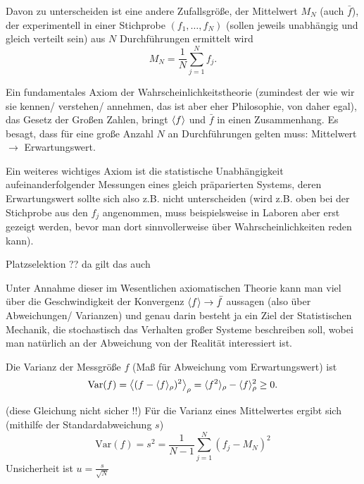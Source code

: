 Davon zu unterscheiden ist eine andere Zufallsgröße, der Mittelwert $M_N$ (auch $\bar{f}$), der experimentell in einer Stichprobe $(f_1, \dots, f_N)$ (sollen jeweils  unabhängig und gleich verteilt sein) aus $N$ Durchführungen ermittelt wird
\begin{equation}\label{key}
M_N = \frac{1}{N} \sum\limits_{j=1}^N f_j .
\end{equation}

Ein fundamentales Axiom der Wahrscheinlichkeitstheorie (zumindest der wie wir sie kennen/ verstehen/ annehmen, das ist aber eher Philosophie, von daher egal), das Gesetz der Großen Zahlen, bringt $\expval{f}$ und $\bar{f}$ in einen Zusammenhang. Es besagt, dass für eine große Anzahl $N$ an Durchführungen gelten muss: Mittelwert $\rightarrow$ Erwartungswert.

Ein weiteres wichtiges Axiom ist die statistische Unabhängigkeit aufeinanderfolgender Messungen eines gleich präparierten Systems, deren Erwartungswert sollte sich also z.B. nicht unterscheiden (wird z.B. oben bei der Stichprobe aus den $f_j$ angenommen, muss beispielsweise in Laboren aber erst gezeigt werden, bevor man dort sinnvollerweise über Wahrscheinlichkeiten reden kann).

Platzselektion ?? da gilt das auch

Unter Annahme dieser im Wesentlichen axiomatischen Theorie kann man viel über die Geschwindigkeit der Konvergenz $\expval{f} \rightarrow \bar{f}$ aussagen (also über Abweichungen/ Varianzen) und genau darin besteht ja ein Ziel der Statistischen Mechanik, die stochastisch das Verhalten großer Systeme beschreiben soll, wobei man natürlich an der Abweichung von der Realität interessiert ist.

Die Varianz der Messgröße $f$ (Maß für Abweichung vom Erwartungswert) ist
\begin{equation}\label{key}
\text{Var}(f) = \expval{ (f - \langle f \rangle_\rho)^2 }_\rho = \langle f^2 \rangle_\rho - \langle f \rangle^2_\rho \geq 0 .
\end{equation}


(diese Gleichung nicht sicher !!) Für die Varianz eines Mittelwertes ergibt sich (mithilfe der Standardabweichung $s$)
\begin{equation}\label{key}
\text{Var}(f) = s^2 = \frac{1}{N-1} \sum\limits_{j=1}^N (f_j - M_N)^2
\end{equation}
Unsicherheit ist $u=\frac{s}{\sqrt{N}}$

